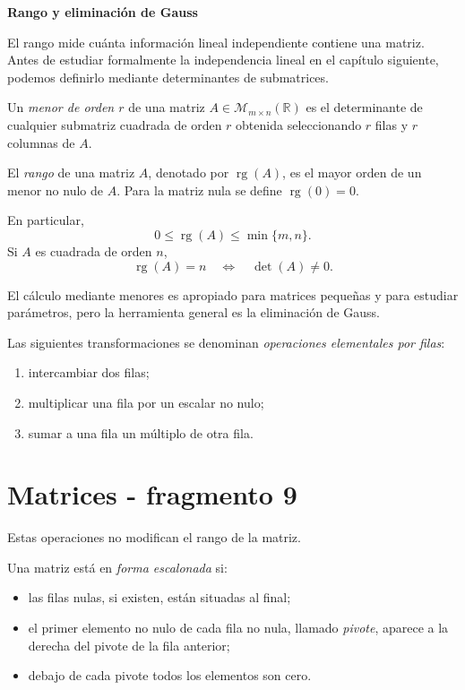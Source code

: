 \textbf{Rango y eliminación de Gauss}

El rango mide cuánta información lineal independiente contiene una matriz. Antes de estudiar formalmente la independencia lineal en el capítulo siguiente, podemos definirlo mediante determinantes de submatrices.

\begin{definition}
Un \emph{menor de orden $r$} de una matriz $A\in\mathcal M_{m\times n}(\mathbb{R})$ es el determinante de cualquier submatriz cuadrada de orden $r$ obtenida seleccionando $r$ filas y $r$ columnas de $A$.
\end{definition}

\begin{definition}[Rango]
El \emph{rango} de una matriz $A$, denotado por $\operatorname{rg}(A)$, es el mayor orden de un menor no nulo de $A$. Para la matriz nula se define $\operatorname{rg}(0)=0$.
\end{definition}

En particular,
\[
0\leq\operatorname{rg}(A)\leq\min\{m,n\}.
\]
Si $A$ es cuadrada de orden $n$,
\[
\operatorname{rg}(A)=n
\quad\Longleftrightarrow\quad
\det(A)\neq0.
\]

El cálculo mediante menores es apropiado para matrices pequeñas y para estudiar parámetros, pero la herramienta general es la eliminación de Gauss.

\begin{definition}
Las siguientes transformaciones se denominan \emph{operaciones elementales por filas}:
\begin{enumerate}[label=\roman*)]
\item intercambiar dos filas;
\item multiplicar una fila por un escalar no nulo;
\item sumar a una fila un múltiplo de otra fila.
\end{enumerate}
\end{definition}


\section{Matrices - fragmento 9}
Estas operaciones no modifican el rango de la matriz.

\begin{definition}
Una matriz está en \emph{forma escalonada} si:
\begin{itemize}
\item las filas nulas, si existen, están situadas al final;
\item el primer elemento no nulo de cada fila no nula, llamado \emph{pivote}, aparece a la derecha del pivote de la fila anterior;
\item debajo de cada pivote todos los elementos son cero.
\end{itemize}
\end{definition}

